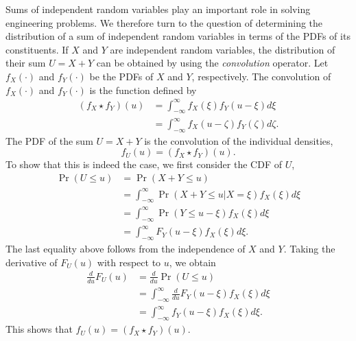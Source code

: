 Sums of independent random variables play an important role in solving engineering problems.
We therefore turn to the question of determining the distribution of a sum of independent random variables in terms of the PDFs of its constituents.
If $X$ and $Y$ are independent random variables, the distribution of their sum $U = X + Y$ can be obtained by using the \emph{convolution} operator. 
Let $f_X (\cdot)$ and $f_Y (\cdot)$ be the PDFs of $X$ and $Y$, respectively.
The convolution of $f_X(\cdot)$ and $f_Y(\cdot)$ is the function defined by
\begin{equation*}
\begin{split}
(f_X \star f_Y) (u)
&= \int_{-\infty}^{\infty} f_X(\xi) f_Y(u - \xi) d\xi \\
&= \int_{-\infty}^{\infty} f_X(u - \zeta) f_Y(\zeta) d\zeta .
\end{split}
\end{equation*}
The PDF of the sum $U = X + Y$ is the convolution of the individual densities,
\begin{equation*}
f_U (u) = (f_X \star f_Y) (u) .
\end{equation*}
To show that this is indeed the case, we first consider the CDF of $U$,
\begin{equation*}
\begin{split}
\Pr (U \leq u) &= \Pr (X + Y \leq u) \\
&= \int_{-\infty}^{\infty} \Pr (X + Y \leq u | X = \xi) f_X(\xi) d\xi \\
&= \int_{-\infty}^{\infty} \Pr (Y \leq u - \xi) f_X(\xi) d\xi \\
&= \int_{-\infty}^{\infty} F_Y (u - \xi) f_X(\xi) d\xi .
\end{split}
\end{equation*}
The last equality above follows from the independence of $X$ and $Y$.
Taking the derivative of $F_U (u)$ with respect to $u$, we obtain
\begin{equation*}
\begin{split}
\frac{d}{du} F_U (u) &= \frac{d}{du} \Pr (U \leq u) \\
&= \int_{-\infty}^{\infty} \frac{d}{du} F_Y (u - \xi) f_X(\xi) d\xi \\
&= \int_{-\infty}^{\infty} f_Y (u - \xi) f_X(\xi) d\xi .
\end{split}
\end{equation*}
This shows that $f_U(u) = (f_X \star f_Y) (u)$.

